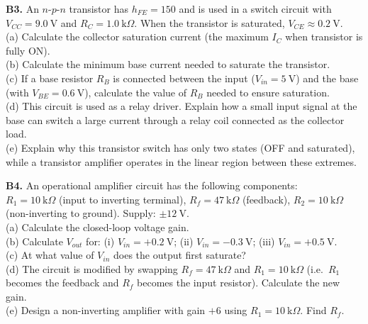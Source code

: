 \begin{exercisebox}[29]
\vspace{0.4cm}

\textbf{B3.} An $n$-$p$-$n$ transistor has
$h_{FE} = 150$ and is used in a switch circuit
with $V_{CC} = 9.0\ \text{V}$ and
$R_C = 1.0\ \text{k}\Omega$. When the transistor
is saturated, $V_{CE} \approx 0.2\ \text{V}$.\\[4pt]
(a) Calculate the collector saturation current
(the maximum $I_C$ when transistor is fully ON).\\
(b) Calculate the minimum base current needed to
saturate the transistor.\\
(c) If a base resistor $R_B$ is connected between
the input ($V_{in} = 5\ \text{V}$) and the base
(with $V_{BE} = 0.6\ \text{V}$), calculate the
value of $R_B$ needed to ensure saturation.\\
(d) This circuit is used as a relay driver. Explain
how a small input signal at the base can switch a
large current through a relay coil connected as
the collector load.\\
(e) Explain why this transistor switch has only
two states (OFF and saturated), while a transistor
amplifier operates in the linear region between
these extremes.
\hfill{}

\vspace{0.4cm}

\textbf{B4.} An operational amplifier circuit
has the following components:\\
$R_1 = 10\ \text{k}\Omega$ (input to inverting
terminal), $R_f = 47\ \text{k}\Omega$ (feedback),
$R_2 = 10\ \text{k}\Omega$ (non-inverting to
ground). Supply: $\pm 12\ \text{V}$.\\[4pt]
(a) Calculate the closed-loop voltage gain.\\
(b) Calculate $V_{out}$ for:
(i) $V_{in} = +0.2\ \text{V}$;
(ii) $V_{in} = -0.3\ \text{V}$;
(iii) $V_{in} = +0.5\ \text{V}$.\\
(c) At what value of $V_{in}$ does the output
first saturate?\\
(d) The circuit is modified by swapping
$R_f = 47\ \text{k}\Omega$ and
$R_1 = 10\ \text{k}\Omega$ (i.e.\ $R_1$ becomes
the feedback and $R_f$ becomes the input resistor).
Calculate the new gain.\\
(e) Design a non-inverting amplifier with gain $+6$
using $R_1 = 10\ \text{k}\Omega$.
Find $R_f$.
\hfill{}

\vspace{0.4cm}


\end{exercisebox}
